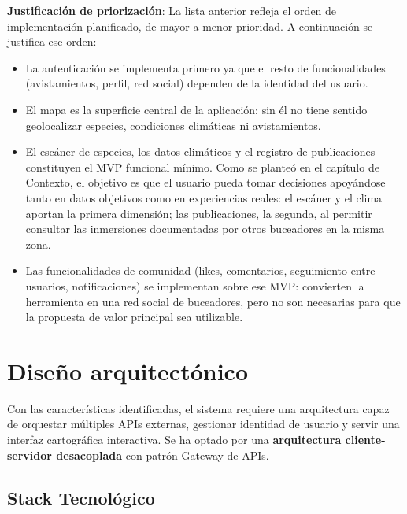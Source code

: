 \textbf{Justificación de priorización}: La lista anterior refleja el orden de implementación planificado, de mayor a menor prioridad. A continuación se justifica ese orden:
\begin{itemize}
    \item La autenticación se implementa primero ya que el resto de funcionalidades (avistamientos, perfil, red social) dependen de la identidad del usuario.
    \item El mapa es la superficie central de la aplicación: sin él no tiene sentido geolocalizar especies, condiciones climáticas ni avistamientos.
    \item El escáner de especies, los datos climáticos y el registro de publicaciones constituyen el MVP funcional mínimo. Como se planteó en el capítulo de Contexto, el objetivo es que el usuario pueda tomar decisiones apoyándose tanto en datos objetivos como en experiencias reales: el escáner y el clima aportan la primera dimensión; las publicaciones, la segunda, al permitir consultar las inmersiones documentadas por otros buceadores en la misma zona.
    \item Las funcionalidades de comunidad (likes, comentarios, seguimiento entre usuarios, notificaciones) se implementan sobre ese MVP: convierten la herramienta en una red social de buceadores, pero no son necesarias para que la propuesta de valor principal sea utilizable.
\end{itemize}

\section{Diseño arquitectónico}
\label{sec:arquitectura}

Con las características identificadas, el sistema requiere una arquitectura capaz de orquestar múltiples APIs externas, gestionar identidad de usuario y servir una interfaz cartográfica interactiva. Se ha optado por una \textbf{arquitectura cliente-servidor desacoplada} con patrón Gateway de APIs.

\subsection{Stack Tecnológico}

